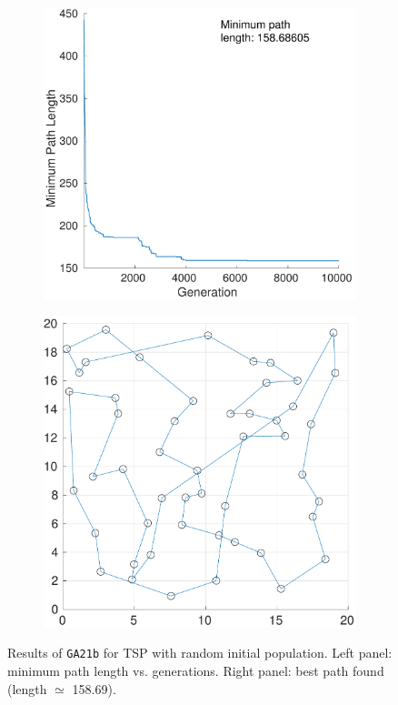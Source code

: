 \documentclass[12pt,titlepage]{article}
\begin{document}
\begin{figure}[H]
\centering
\begin{subfigure}{0.45\textwidth}
	\includegraphics[width=\textwidth]{Figures/2b_minpathLength}
	\caption{}
	\label{subfig:2b_minPathLength}
\end{subfigure} %
\hfill %
\begin{subfigure}{0.45\textwidth}
	\includegraphics[width=\textwidth]{Figures/2b_pathPlot}
	\caption{}
	\label{subfig:2b_pathPlot}
\end{subfigure} %
\caption{Results of \texttt{GA21b} for TSP with random initial population. Left panel: minimum path length vs. generations. Right panel: best path found (length $\simeq$ 158.69).}
\label{fig:1b}
\end{figure}
\end{document}
